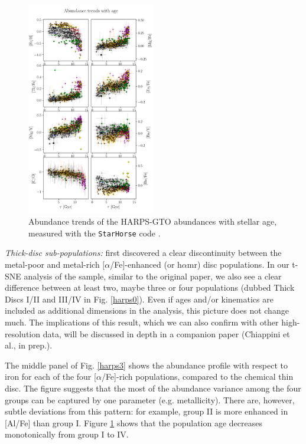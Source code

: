 \documentclass{aa}  %
\begin{document}
\begin{figure}\centering
 \includegraphics[width=0.5\textwidth]{im/harps_tsne-age-abundsplot_teffcut.png}
\caption{Abundance trends of the HARPS-GTO abundances with stellar age, measured with the \texttt{StarHorse} code \citep{Queiroz2018}.}
\label{age}
\end{figure}

{\it Thick-disc sub-populations:} \citet{Adibekyan2011} first discovered a clear discontinuity between the metal-poor and metal-rich $[\alpha$/Fe]-enhanced (or h$\alpha$mr) disc populations. In our t-SNE analysis of the \citet{DelgadoMena2017} sample, similar to the original paper, we also see a clear difference between at least two, maybe three or four populations (dubbed Thick Discs I/II and III/IV in Fig. \ref{harps0}). Even if ages and/or kinematics are included as additional dimensions in the analysis, this picture does not change much. The implications of this result, which we can also confirm with other high-resolution data, will be discussed in depth in a companion paper (Chiappini et al., in prep.).

The middle panel of Fig. \ref{harps3} shows the abundance profile with respect to iron for each of the four [$\alpha$/Fe]-rich populations, compared to the chemical thin disc. The figure suggests that the most of the abundance variance among the four groups can be captured by one parameter (e.g. metallicity). There are, however, subtle deviations from this pattern: for example, group II is more enhanced in [Al/Fe] than group I. Figure \ref{age} shows that the population age decreases monotonically from group I to IV. 
\end{document}
